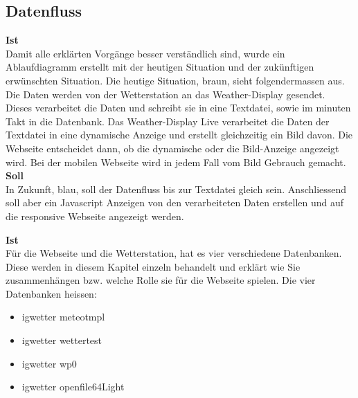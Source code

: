 \subsection{Datenfluss}
\textbf{Ist}\\
Damit alle erklärten Vorgänge besser verständlich sind, wurde ein Ablaufdiagramm erstellt mit der heutigen Situation und der zukünftigen erwünschten Situation. Die heutige Situation, braun,  sieht folgendermassen aus. Die Daten werden von der Wetterstation an das Weather-Display gesendet. Dieses verarbeitet die Daten und schreibt sie in eine Textdatei, sowie im minuten Takt in die Datenbank. Das Weather-Display Live verarbeitet die Daten der Textdatei in eine dynamische Anzeige und erstellt gleichzeitig ein Bild davon. Die Webseite entscheidet dann, ob die dynamische oder die Bild-Anzeige angezeigt wird. Bei der mobilen Webseite wird in jedem Fall vom Bild Gebrauch gemacht. \\
\textbf{Soll}\\
In Zukunft, blau, soll der Datenfluss bis zur Textdatei gleich sein. Anschliessend soll aber ein Javascript Anzeigen von den verarbeiteten Daten erstellen und auf die responsive Webseite angezeigt werden.\\






\textbf{Ist}\\
Für die Webseite und die Wetterstation, hat es vier verschiedene Datenbanken. Diese werden in diesem Kapitel einzeln behandelt und erklärt wie Sie zusammenhängen bzw. welche Rolle sie für die Webseite spielen. Die vier Datenbanken heissen:
\begin{itemize}  
\item igwetter meteotmpl
\item igwetter wettertest
\item igwetter wp0
\item igwetter openfile64Light
\end{itemize}

